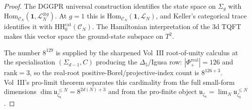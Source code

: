\begin{proof}
The DGGPR universal construction identifies the state space on
$\Sigma_g$ with
$\mathrm{Hom}_{\mathcal C_N}(\mathbf 1,\mathcal L_N^{\otimes g})$.
At $g=1$ this is
$\mathrm{Hom}_{\mathcal C_N}(\mathbf 1,\mathcal L_N)$, and Keller's
categorical trace identifies it with
$\mathrm{HH}_0^{\mathrm{cat}}(\mathcal C_N)$.  The Hamiltonian
interpretation of the 3d TQFT makes this vector space the
ground-state subspace on $T^2$.

The number $8^{129}$ is supplied by the sharpened Vol~III root-of-unity
calculus at the specialisation $(\Sigma_{d-1},C)$ producing the
$\Delta_5$/Igusa row: $|\Phi^{\mathrm{real}}_+|=126$ and
$\mathrm{rank}=3$, so the real-root positive-Borel/projective-index
count is $8^{126+3}$.  Vol~III's pro-limit theorem separates this
cardinality from the full small-form dimensions
$\dim\mathfrak u_{\zeta_8}^{\le N}=8^{2d(N)+3}$ and from the
pro-finite object
$\mathfrak u_{\zeta_8}=\lim_N\mathfrak u_{\zeta_8}^{\le N}$.
\end{proof}

